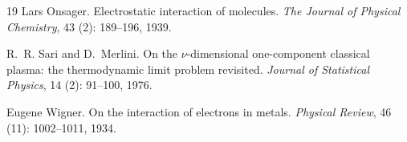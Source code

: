\documentclass[final,reqno]{amsart}
\theoremstyle{remark}
\theoremstyle{definition}
\begin{document}
\begin{thebibliography}{19}
Lars Onsager.
\newblock Electrostatic interaction of molecules.
\newblock \emph{The Journal of Physical Chemistry}, 43 (2):
  189--196, 1939.

R.~R. Sari and D.~Merlini.
\newblock On the $\nu$-dimensional one-component classical plasma: the
  thermodynamic limit problem revisited.
\newblock \emph{Journal of Statistical Physics}, 14 (2):
  91--100, 1976.

Eugene Wigner.
\newblock On the interaction of electrons in metals.
\newblock \emph{Physical Review}, 46 (11): 1002--1011, 1934.

\end{thebibliography}
\end{document}
